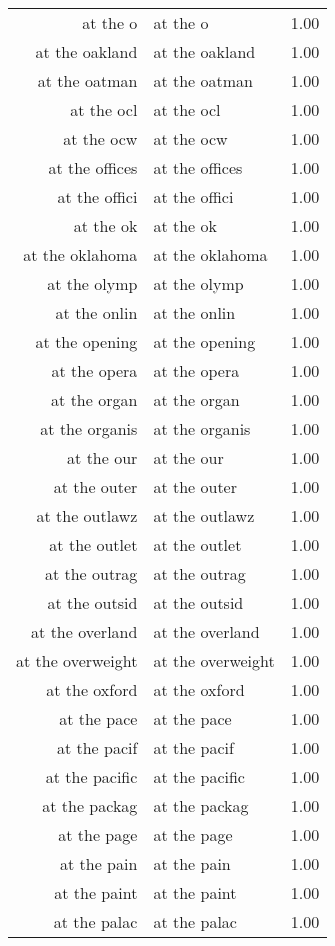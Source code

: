 \begin{table}[ht]
\begin{tabular}{rlr}
  at the o & at the o & 1.00 \\ 
  at the oakland & at the oakland & 1.00 \\ 
  at the oatman & at the oatman & 1.00 \\ 
  at the ocl & at the ocl & 1.00 \\ 
  at the ocw & at the ocw & 1.00 \\ 
  at the offices & at the offices & 1.00 \\ 
  at the offici & at the offici & 1.00 \\ 
  at the ok & at the ok & 1.00 \\ 
  at the oklahoma & at the oklahoma & 1.00 \\ 
  at the olymp & at the olymp & 1.00 \\ 
  at the onlin & at the onlin & 1.00 \\ 
  at the opening & at the opening & 1.00 \\ 
  at the opera & at the opera & 1.00 \\ 
  at the organ & at the organ & 1.00 \\ 
  at the organis & at the organis & 1.00 \\ 
  at the our & at the our & 1.00 \\ 
  at the outer & at the outer & 1.00 \\ 
  at the outlawz & at the outlawz & 1.00 \\ 
  at the outlet & at the outlet & 1.00 \\ 
  at the outrag & at the outrag & 1.00 \\ 
  at the outsid & at the outsid & 1.00 \\ 
  at the overland & at the overland & 1.00 \\ 
  at the overweight & at the overweight & 1.00 \\ 
  at the oxford & at the oxford & 1.00 \\ 
  at the pace & at the pace & 1.00 \\ 
  at the pacif & at the pacif & 1.00 \\ 
  at the pacific & at the pacific & 1.00 \\ 
  at the packag & at the packag & 1.00 \\ 
  at the page & at the page & 1.00 \\ 
  at the pain & at the pain & 1.00 \\ 
  at the paint & at the paint & 1.00 \\ 
  at the palac & at the palac & 1.00 \\ 

\end{tabular}
\end{table}

